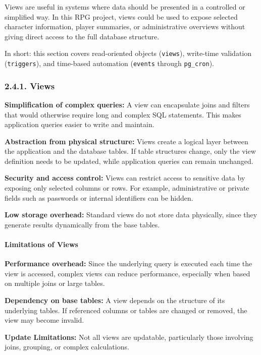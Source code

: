 Views are useful in systems where data should be presented in a
controlled or simplified way. In this RPG project, views could be used
to expose selected character information, player summaries, or
administrative overviews without giving direct access to the full
database structure.

In short: this section covers read-oriented objects (\texttt{views}),
write-time validation (\texttt{triggers}), and time-based automation
(\texttt{events} through \texttt{pg\_cron}).

\hypertarget{views}{%
\subsubsection{2.4.1. Views}\label{views}}

\textbf{Simplification of complex queries:} A view can encapsulate joins
and filters that would otherwise require long and complex SQL
statements. This makes application queries easier to write and maintain.

\textbf{Abstraction from physical structure:} Views create a logical
layer between the application and the database tables. If table
structures change, only the view definition needs to be updated, while
application queries can remain unchanged.

\textbf{Security and access control:} Views can restrict access to
sensitive data by exposing only selected columns or rows. For example,
administrative or private fields such as passwords or internal
identifiers can be hidden.

\textbf{Low storage overhead:} Standard views do not store data
physically, since they generate results dynamically from the base
tables.

\hypertarget{limitations-of-views}{%
\paragraph{Limitations of Views}\label{limitations-of-views}}

\textbf{Performance overhead:} Since the underlying query is executed
each time the view is accessed, complex views can reduce performance,
especially when based on multiple joins or large tables.

\textbf{Dependency on base tables:} A view depends on the structure of
its underlying tables. If referenced columns or tables are changed or
removed, the view may become invalid.

\textbf{Update Limitations:} Not all views are updatable, particularly
those involving joins, grouping, or complex calculations.

